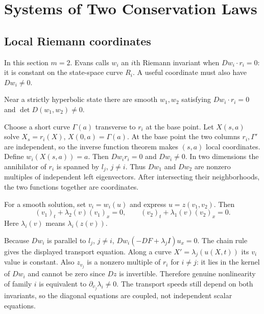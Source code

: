 \section{Systems of Two Conservation Laws}
\label{sec:11-3}
\subsection{Local Riemann coordinates}
In this section $m=2$. Evans calls $w_i$ an $i$th Riemann invariant
when $Dw_i\cdot r_i=0$: it is constant on the state-space curve $R_i$.
A useful coordinate must also have $Dw_i\ne0$.
\begin{lemma}
Near a strictly hyperbolic state there are smooth $w_1,w_2$ satisfying
$Dw_i\cdot r_i=0$ and $\det D(w_1,w_2)\ne0$.
\end{lemma}
\begin{expandedproof}
Choose a short curve $\Gamma(a)$ transverse to $r_i$ at the base
point. Let $X(s,a)$ solve $X_s=r_i(X)$, $X(0,a)=\Gamma(a)$.
At the base point the two columns $r_i,\Gamma'$ are independent,
so the inverse function theorem makes $(s,a)$ local coordinates.
Define $w_i(X(s,a))=a$. Then $Dw_i r_i=0$ and $Dw_i\ne0$.
In two dimensions the annihilator of $r_i$ is spanned by $l_j$,
$j\ne i$. Thus $Dw_1$ and $Dw_2$ are nonzero multiples of
independent left eigenvectors. After intersecting their neighborhoods,
the two functions together are coordinates.
\end{expandedproof}

\begin{theorem}
For a smooth solution, set $v_i=w_i(u)$ and express $u=z(v_1,v_2)$.
Then
\begin{equation}\label{eq:11-diagonal}
 (v_1)_t+\lambda_2(v)(v_1)_x=0,\qquad
 (v_2)_t+\lambda_1(v)(v_2)_x=0.
\end{equation}
Here $\lambda_i(v)$ means $\lambda_i(z(v))$.
\end{theorem}
\begin{expandedproof}
Because $Dw_i$ is parallel to $l_j$, $j\ne i$,
$Dw_i(-DF+\lambda_jI)u_x=0$. The chain rule gives the displayed
transport equation. Along a curve $X'=\lambda_j(u(X,t))$ its $v_i$
value is constant. Also $z_{v_j}$ is a nonzero multiple of $r_i$
for $i\ne j$: it lies in the kernel of $Dw_i$ and cannot be zero
since $Dz$ is invertible. Therefore genuine nonlinearity of family
$i$ is equivalent to $\partial_{v_j}\lambda_i\ne0$. The transport
speeds still depend on both invariants, so the diagonal equations
are coupled, not independent scalar equations.
\end{expandedproof}

